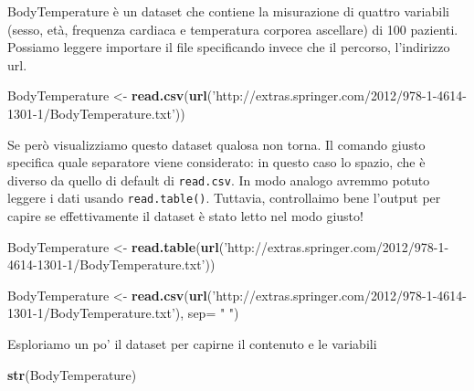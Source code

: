 \documentclass[]{book}
\newenvironment{Shaded}{\begin{snugshade}}{\end{snugshade}}
\newcommand{\DataTypeTok}[1]{\textcolor[rgb]{0.13,0.29,0.53}{#1}}
\newcommand{\KeywordTok}[1]{\textcolor[rgb]{0.13,0.29,0.53}{\textbf{#1}}}
\newcommand{\NormalTok}[1]{#1}
\newcommand{\StringTok}[1]{\textcolor[rgb]{0.31,0.60,0.02}{#1}}
\begin{document}
BodyTemperature è un dataset che contiene la misurazione di quattro variabili (sesso, età, frequenza cardiaca e temperatura corporea ascellare) di 100 pazienti. Possiamo leggere importare il file specificando invece che il percorso, l'indirizzo url.

\begin{Shaded}
\begin{Highlighting}[]
\NormalTok{BodyTemperature <-}\StringTok{ }\KeywordTok{read.csv}\NormalTok{(}\KeywordTok{url}\NormalTok{(}\StringTok{'http://extras.springer.com/2012/978-1-4614-1301-1/BodyTemperature.txt'}\NormalTok{))}
\end{Highlighting}
\end{Shaded}

Se però visualizziamo questo dataset qualosa non torna.
Il comando giusto specifica quale separatore viene considerato: in questo caso lo spazio, che è diverso da quello di default di \texttt{read.csv}. In modo analogo avremmo potuto leggere i dati usando \texttt{read.table()}. Tuttavia, controllaimo bene l'output per capire se effettivamente il dataset è stato letto nel modo giusto!

\begin{Shaded}
\begin{Highlighting}[]
\NormalTok{BodyTemperature <-}\StringTok{ }\KeywordTok{read.table}\NormalTok{(}\KeywordTok{url}\NormalTok{(}\StringTok{'http://extras.springer.com/2012/978-1-4614-1301-1/BodyTemperature.txt'}\NormalTok{))}
\end{Highlighting}
\end{Shaded}

\begin{Shaded}
\begin{Highlighting}[]
\NormalTok{BodyTemperature <-}\StringTok{ }\KeywordTok{read.csv}\NormalTok{(}\KeywordTok{url}\NormalTok{(}\StringTok{'http://extras.springer.com/2012/978-1-4614-1301-1/BodyTemperature.txt'}\NormalTok{), }\DataTypeTok{sep=} \StringTok{" "}\NormalTok{)}
\end{Highlighting}
\end{Shaded}

Esploriamo un po' il dataset per capirne il contenuto e le variabili

\begin{Shaded}
\begin{Highlighting}[]
\KeywordTok{str}\NormalTok{(BodyTemperature)}
\end{Highlighting}
\end{Shaded}
\end{document}
